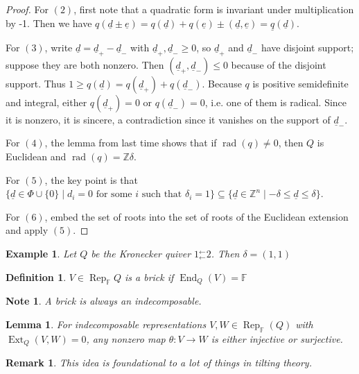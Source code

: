 \documentclass{book}
\newtheorem{lemma}[theorem]{Lemma}
\newtheorem{definition}[theorem]{Definition}
\newtheorem{remark}[theorem]{Remark}
\newtheorem{example}{Example}[section]
\newtheorem{note}[theorem]{Note}
\newcommand{\defterm}{\emph}
\DeclareMathOperator{\Rep}{Rep}
\DeclareMathOperator{\rad}{rad}
\DeclareMathOperator{\End}{End}
\DeclareMathOperator{\Ext}{Ext}
\begin{document}
\begin{proof}
For $(2)$, first note that a quadratic form is invariant under multiplication by -1. Then we have $q(\underline d \pm \underline e) = q(\underline d) + q(\underline e) \pm (\underline d, \underline e) = \underline q(\underline d)$.

For $(3)$, write $\underline d = \underline d_+ - \underline d_-$ with $\underline d_+, \underline d_- \geq 0$, so $\underline d_+$ and $\underline d_-$ have disjoint support; suppose they are both nonzero. Then $(\underline d_+, \underline d_-) \leq 0$ because of the disjoint support. Thus $1 \geq q(\underline d) = q(\underline d_+) + q(\underline d_-)$. Because $q$ is positive semidefinite and integral, either $q(\underline d_+) = 0$ or $q(\underline d_-) = 0$, i.e. one of them is radical. Since it is nonzero, it is sincere, a contradiction since it vanishes on the support of $\underline d_-$.

For $(4)$, the lemma from last time shows that if $\rad(q) \neq 0$, then $Q$ is Euclidean and $\rad(q) = \mathbb{Z} \delta$.

For $(5)$, the key point is that $\{\underline d \in \Phi \cup \{0\} \mid d_i = 0 \text{ for some } i \text{ such that } \delta_i = 1\} \subseteq \{ \underline d \in \mathbb Z^n \mid - \delta \leq \underline d \leq \delta \}$.

For $(6)$, embed the set of roots into the set of roots of the Euclidean extension and apply $(5)$.
\end{proof}

\begin{example}
Let $Q$ be the Kronecker quiver $1 {}^\leftarrow_\leftarrow 2$. Then $\delta = (1,1)$  
\end{example}

\begin{definition}
$V \in \Rep_\mathbb{F} Q$ is a \defterm{brick} if $\End_Q(V) = \mathbb{F}$
\end{definition}

\begin{note}
 A brick is always an indecomposable.
\end{note}

\begin{lemma}
For indecomposable representations $V,W \in \Rep_\mathbb{F}(Q)$ with $\Ext_Q(V,W) = 0$, any nonzero map $\theta: V \to W$ is either injective or surjective.
\end{lemma}

\begin{remark}
This idea is foundational to a lot of things in tilting theory.
\end{remark} 
\end{document}
